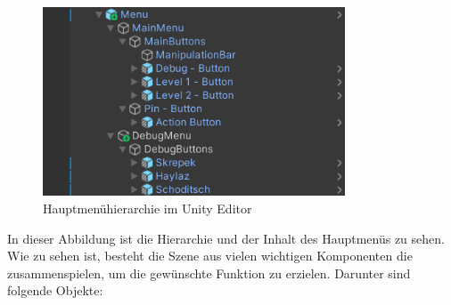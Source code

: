 \begin{figure}[h]
    \centering
    \includegraphics[width=0.8\textwidth]{images/menuHierarchy.png}
    \caption{Hauptmenühierarchie im Unity Editor}
    \label{fig:menühierarchy}
\end{figure}


In dieser Abbildung ist die Hierarchie und der Inhalt des Hauptmenüs zu sehen. Wie zu sehen ist, besteht die Szene aus
vielen wichtigen Komponenten die zusammenspielen, um die gewünschte Funktion zu erzielen. Darunter sind folgende Objekte:

